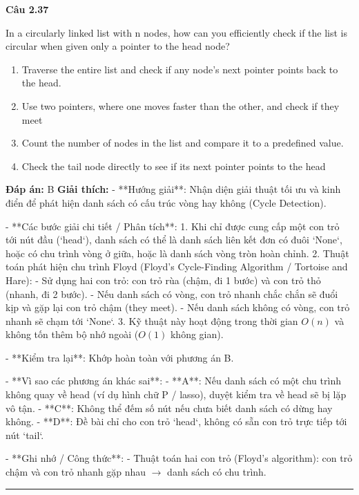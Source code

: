 \documentclass[11pt,a4paper]{article}
\newenvironment{question}[1]{%
  \par\vspace{1em}\noindent\textbf{\large Câu #1}\par\vspace{0.4em}
}{%
  \par\vspace{1em}\hrule\vspace{0.6em}
}
\newenvironment{choices}{%
  \begin{enumerate}[label=\textbf{\Alph*.},leftmargin=2.2em,itemsep=2pt,topsep=3pt]
}{%
  \end{enumerate}
}
\newcommand{\choice}{\item}
\begin{document}
\begin{question}{2.37}
In a circularly linked list with n nodes, how can you efficiently check if the list is circular when given only a pointer to the head node?
\begin{choices}
\choice Traverse the entire list and check if any node's next pointer points back to the head.
\choice Use two pointers, where one moves faster than the other, and check if they meet
\choice Count the number of nodes in the list and compare it to a predefined value.
\choice Check the tail node directly to see if its next pointer points to the head
\end{choices}
\textbf{Đáp án:} B
\textbf{Giải thích:} - **Hướng giải**:
  Nhận diện giải thuật tối ưu và kinh điển để phát hiện danh sách có cấu trúc vòng hay không (Cycle Detection).

- **Các bước giải chi tiết / Phân tích**:
  1. Khi chỉ được cung cấp một con trỏ tới nút đầu (`head`), danh sách có thể là danh sách liên kết đơn có đuôi `None`, hoặc có chu trình vòng ở giữa, hoặc là danh sách vòng tròn hoàn chỉnh.
  2. Thuật toán phát hiện chu trình Floyd (Floyd's Cycle-Finding Algorithm / Tortoise and Hare):
     - Sử dụng hai con trỏ: con trỏ rùa (chậm, đi 1 bước) và con trỏ thỏ (nhanh, đi 2 bước).
     - Nếu danh sách có vòng, con trỏ nhanh chắc chắn sẽ đuổi kịp và gặp lại con trỏ chậm (they meet).
     - Nếu danh sách không có vòng, con trỏ nhanh sẽ chạm tới `None`.
  3. Kỹ thuật này hoạt động trong thời gian \(O(n)\) và không tốn thêm bộ nhớ ngoài (\(O(1)\) không gian).

- **Kiểm tra lại**:
  Khớp hoàn toàn với phương án B.

- **Vì sao các phương án khác sai**:
  - **A**: Nếu danh sách có một chu trình không quay về head (ví dụ hình chữ P / lasso), duyệt kiểm tra về head sẽ bị lặp vô tận.
  - **C**: Không thể đếm số nút nếu chưa biết danh sách có dừng hay không.
  - **D**: Đề bài chỉ cho con trỏ `head`, không có sẵn con trỏ trực tiếp tới nút `tail`.

- **Ghi nhớ / Công thức**:
  - Thuật toán hai con trỏ (Floyd's algorithm): con trỏ chậm và con trỏ nhanh gặp nhau \(\rightarrow\) danh sách có chu trình.
\end{question}
\end{document}
